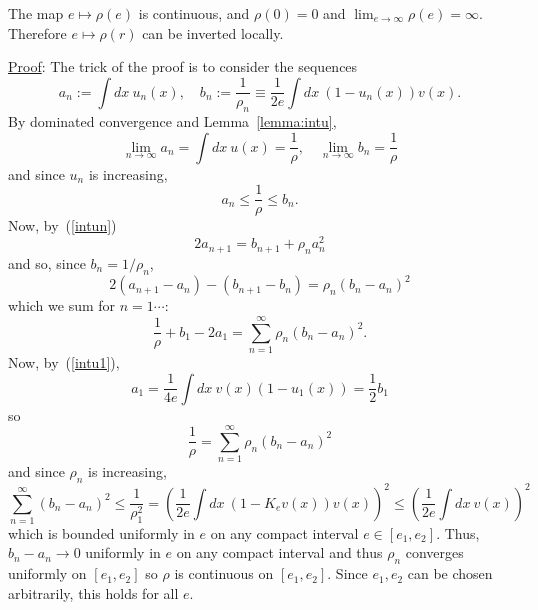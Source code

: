 \documentclass{ian}
\begin{document}
\label{lemma:surjective}
  The map $e\mapsto\rho(e)$ is continuous, and $\rho(0)=0$ and $\lim_{e\to\infty}\rho(e)=\infty$.
  Therefore $e\mapsto\rho(r)$ can be inverted locally.
\endtheo
\bigskip

\indent\underline{Proof}:
  The trick of the proof is to consider the sequences
  \begin{equation}
    a_n:=\int dx\ u_n(x)
    ,\quad
    b_n:=\frac1{\rho_n}\equiv\frac1{2e}\int dx\ (1-u_n(x))v(x)
    .
  \end{equation}
  By dominated convergence and Lemma\-~\ref{lemma:intu},
  \begin{equation}
    \lim_{n\to\infty}a_n=\int dx\ u(x)=\frac1\rho
    ,\quad
    \lim_{n\to\infty}b_n=\frac1\rho
  \end{equation}
  and since $u_n$ is increasing,
  \begin{equation}
    a_n\leqslant\frac1\rho\leqslant b_n
    .
  \end{equation}
  Now, by\-~(\ref{intun})
  \begin{equation}
    2a_{n+1}
    =b_{n+1}
    +\rho_na_n^2
  \end{equation}
  and so, since $b_n=1/\rho_n$,
  \begin{equation}
    2(a_{n+1}-a_n)-(b_{n+1}-b_n)=\rho_n(b_n-a_n)^2
  \end{equation}
  which we sum for $n=1\cdots$:
  \begin{equation}
    \frac1\rho+b_1-2a_1=\sum_{n=1}^\infty \rho_n(b_n-a_n)^2
    .
  \end{equation}
  Now, by\-~(\ref{intu1}),
  \begin{equation}
    a_1=\frac1{4e}\int dx\ v(x)(1-u_1(x))
    =\frac12b_1
  \end{equation}
  so
  \begin{equation}
    \frac1\rho=\sum_{n=1}^\infty\rho_n(b_n-a_n)^2
  \end{equation}
  and since $\rho_n$ is increasing,
  \begin{equation}
    \sum_{n=1}^\infty(b_n-a_n)^2\leqslant \frac1{\rho_1^2}
    =\left(\frac1{2e}\int dx\ (1-K_ev(x))v(x)\right)^2
    \leqslant\left(\frac1{2e}\int dx\ v(x)\right)^2
  \end{equation}
  which is bounded uniformly in $e$ on any compact interval $e\in[e_1,e_2]$.
  Thus, $b_n-a_n\to0$ uniformly in $e$ on any compact interval and thus $\rho_n$ converges uniformly on $[e_1,e_2]$ so $\rho$ is continuous on $[e_1,e_2]$.
  Since $e_1,e_2$ can be chosen arbitrarily, this holds for all $e$.
  \bigskip
\end{document}
